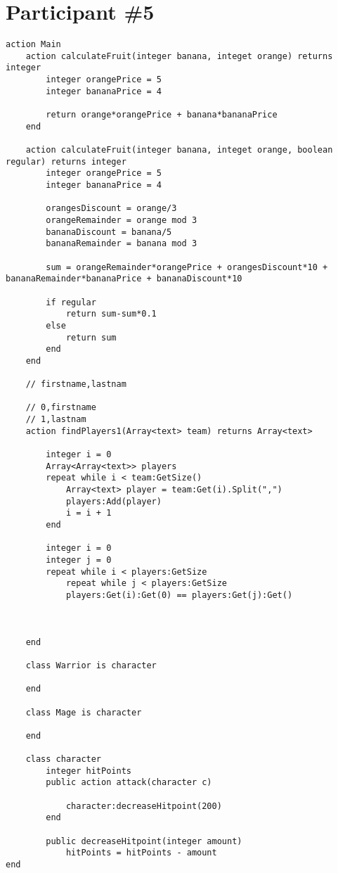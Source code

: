 \section{Participant \#5}
\begin{lstlisting}[language=Quorum]
action Main
	action calculateFruit(integer banana, integet orange) returns integer
		integer orangePrice = 5
		integer bananaPrice = 4
		
		return orange*orangePrice + banana*bananaPrice
	end
	
	action calculateFruit(integer banana, integet orange, boolean regular) returns integer
		integer orangePrice = 5
		integer bananaPrice = 4
		
		orangesDiscount = orange/3
		orangeRemainder = orange mod 3
		bananaDiscount = banana/5
		bananaRemainder = banana mod 3
		
		sum = orangeRemainder*orangePrice + orangesDiscount*10 + bananaRemainder*bananaPrice + bananaDiscount*10
		
		if regular
			return sum-sum*0.1
		else
			return sum
		end
	end
	
	// firstname,lastnam
	
	// 0,firstname
	// 1,lastnam
	action findPlayers1(Array<text> team) returns Array<text>
		
		integer i = 0
		Array<Array<text>> players
		repeat while i < team:GetSize()
			Array<text> player = team:Get(i).Split(",")
			players:Add(player)
			i = i + 1
		end
		
		integer i = 0
		integer j = 0
		repeat while i < players:GetSize
			repeat while j < players:GetSize
			players:Get(i):Get(0) == players:Get(j):Get()
			
			
		
	end
	
	class Warrior is character
		
	end
	
	class Mage is character
	
	end
	
	class character
		integer hitPoints
		public action attack(character c)
		
			character:decreaseHitpoint(200)
		end
		
		public decreaseHitpoint(integer amount)
			hitPoints = hitPoints - amount
end
\end{lstlisting}

